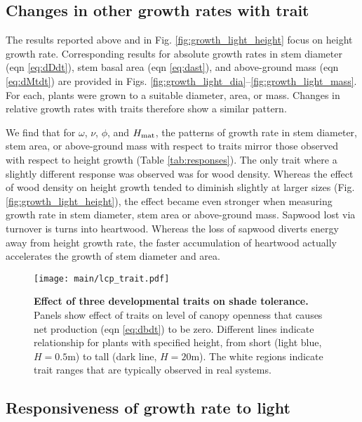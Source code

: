 \documentclass[9pt,twocolumn,twoside]{pnas-new}
\begin{document}
\subsection{Changes in other growth rates with trait}

The results reported above and in Fig. \ref{fig:growth_light_height} focus on height growth rate. Corresponding results for absolute growth rates in stem diameter (eqn \ref{eq:dDdt}), stem basal area (eqn \ref{eq:dast}), and above-ground mass (eqn \ref{eq:dMtdt}) are provided in Figs. \ref{fig:growth_light_dia}--\ref{fig:growth_light_mass}. For each, plants were grown to a suitable diameter, area, or mass. Changes in relative growth rates with traits therefore show a similar pattern.

We find that for $\omega$, $\nu$, $\phi$, and $H_{\rm mat}$, the patterns of growth rate in stem diameter, stem area, or above-ground mass with respect to traits mirror those observed with respect to height growth (Table \ref{tab:responses}). The only trait where a slightly different response was observed was for wood density. Whereas the effect of wood density on height growth tended to diminish slightly at larger sizes (Fig. \ref{fig:growth_light_height}), the effect became even stronger when measuring growth rate in stem diameter, stem area or above-ground mass. Sapwood lost via turnover is turns into heartwood. Whereas the loss of sapwood diverts energy away from height growth rate, the faster accumulation of heartwood actually accelerates the growth of stem diameter and area.

\begin{SCfigure*}[\sidecaptionrelwidth][b]
\centering
\texttt{[image: main/lcp\_trait.pdf]}
\caption{\textbf{Effect of three developmental traits on shade tolerance.}
Panels show effect of traits on level of canopy openness that causes net production (eqn \ref{eq:dbdt}) to be zero. Different lines indicate relationship for plants with specified height, from short (light blue,  $H=0.5$m) to tall (dark line, $H=20$m). The white regions indicate trait ranges that are typically observed in real systems.
\label{fig:wplcp}}
\end{SCfigure*}

\subsection{Responsiveness of growth rate to light}
\end{document}
